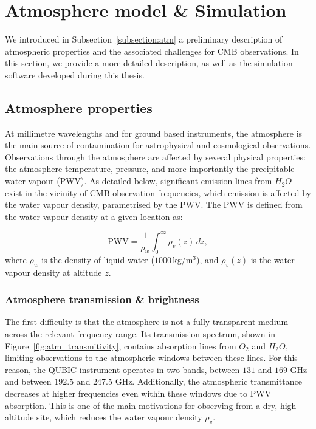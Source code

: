 \documentclass[../../thesis.tex]{subfiles}
\begin{document}
\section{Atmosphere model \& Simulation} \label{section:atm_simulation}

We introduced in Subsection~\ref{subsection:atm} a preliminary description of atmospheric properties and the associated challenges for CMB observations. In this section, we provide a more detailed description, as well as the simulation software developed during this thesis.

\subsection{Atmosphere properties}

At millimetre wavelengths and for ground based instruments, the atmosphere is the main source of contamination for astrophysical and cosmological observations. Observations through the atmosphere are affected by several physical properties: the atmosphere temperature, pressure, and more importantly the precipitable water vapour (PWV). As detailed below, significant emission lines from $H_2O$ exist in the vicinity of CMB observation frequencies, which emission is affected by the water vapour density, parametrised by the PWV. The PWV is defined from the water vapour density at a given location as:

\begin{equation}
    \mathrm{PWV} = \frac{1}{\rho_w} \int_0^{\infty} \rho_v(z)\, dz,
\end{equation}
where $\rho_w$ is the density of liquid water ($1000\,\mathrm{kg/m^3}$), and $\rho_v(z)$ is the water vapour density at altitude $z$.

\subsubsection{Atmosphere transmission \& brightness}

The first difficulty is that the atmosphere is not a fully transparent medium across the relevant frequency range. Its transmission spectrum, shown in Figure~\ref{fig:atm_transmitivity}, contains absorption lines from $O_2$ and $H_2O$, limiting observations to the atmospheric windows between these lines. For this reason, the QUBIC instrument operates in two bands, between $131$ and $169$ GHz and between $192.5$ and $247.5$ GHz. Additionally, the atmospheric transmittance decreases at higher frequencies even within these windows due to PWV absorption. This is one of the main motivations for observing from a dry, high-altitude site, which reduces the water vapour density $\rho_v$.
\end{document}
